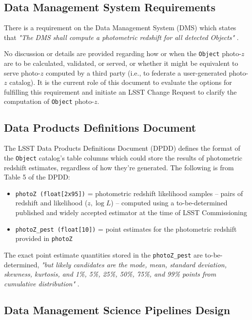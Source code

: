 \documentclass[DM,lsstdraft,toc]{lsstdoc}
\begin{document}
\subsection{Data Management System Requirements}\label{ssec:docs_dmsr}

There is a requirement on the Data Management System (DMS) which states that {\it "The DMS shall compute a photometric redshift for all detected Objects"} . 

No discussion or details are provided regarding how or when the {\tt Object} photo-$z$ are to be calculated, validated, or served, or whether it might be equivalent to serve photo-$z$ computed by a third party (i.e., to federate a user-generated photo-$z$ catalog).
It is the current role of this document to evaluate the options for fulfilling this requirement and initiate an LSST Change Request to clarify the computation of {\tt Object} photo-$z$.

\subsection{Data Products Definitions Document}\label{ssec:docs_dpdd}

The LSST Data Products Definitions Document (DPDD)  defines the format of the {\tt Object} catalog's table columns which could store the results of photometric redshift estimates, regardless of how they're generated. 
The following is from Table 5 of the DPDD:
\vspace{-15pt}
\begin{itemize}
\item \texttt{photoZ (float[2x95])} = photometric redshift likelihood samples -- pairs of redshift and likelihood ($z,\log{L}$) -- computed using a to-be-determined published and widely accepted estimator at the time of LSST Commissioning
\item \texttt{photoZ\_pest (float[10])} = point estimates for the photometric redshift provided in {\tt photoZ}
\end{itemize}

The exact point estimate quantities stored in the \texttt{photoZ\_pest} are to-be-determined, {\it "but likely candidates are the mode, mean, standard deviation, skewness, kurtosis, and 1\%, 5\%, 25\%, 50\%, 75\%, and 99\% points from cumulative distribution"} . 

\subsection{Data Management Science Pipelines Design}\label{ssec:docs_ldm151}
\end{document}

